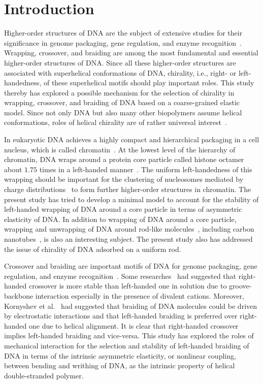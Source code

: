 \documentclass[a4paper,10pt]{article}
\begin{document}
\section{Introduction}
Higher-order structures of DNA are the subject of extensive studies for their significance in genome packaging, gene regulation, and enzyme recognition~\cite{1,2}.
Wrapping, crossover, and braiding are among the most fundamental and essential higher-order structures of DNA.
Since all these higher-order structures are associated with superhelical conformations of DNA, chirality, i.e., right- or left-handedness, of these superhelical motifs should play important roles.
This study thereby has explored a possible mechanism for the selection of chirality in wrapping, crossover, and braiding of DNA based on a coarse-grained elastic model.
Since not only DNA but also many other biopolymers assume helical conformations, roles of helical chirality are of rather universal interest~\cite{3}.

In eukaryotic DNA achieves a highly compact and hierarchical packaging in a cell nucleus, which is called chromatin~\cite{10}.
At the lowest level of the hierarchy of chromatin, DNA wraps around a protein core particle called histone octamer about $1.75$ times in a left-handed manner~\cite{1,2}.
The uniform left-handedness of this wrapping should be important for the clustering of nucleosomes mediated by charge distributions~\cite{16} to form further higher-order structures in chromatin.
The present study has tried to develop a minimal model to account for the stability of left-handed wrapping of DNA around a core particle in terms of asymmetric elasticity of DNA.
In addition to wrapping of DNA around a core particle, wrapping and unwrapping of DNA around rod-like molecules~\cite{27}, including carbon nanotubes~\cite{rod_2}, is also an interesting subject.
The present study also has addressed the issue of chirality of DNA adsorbed on a uniform rod.

Crossover and braiding are important motifs of DNA for genome packaging, gene regulation, and enzyme recognition~\cite{br_1}.
Some researches~\cite{br_1, br_2, br_3} had suggested that right-handed crossover is more stable than left-handed one in solution due to groove-backbone interaction especially in the presence of divalent cations.
Moreover, Kornyshev et al.~\cite{br_4, br_5} had suggested that braiding of DNA molecules could be driven by electrostatic interactions and that left-handed braiding is preferred over right-handed one due to helical alignment.
It is clear that right-handed crossover implies left-handed braiding and vice-versa.
This study has explored the roles of mechanical interaction for the selection and stability of left-handed braiding of DNA in terms of the intrinsic asymmetric elasticity, or nonlinear coupling, between bending and writhing of DNA, as the intrinsic property of helical double-stranded polymer.
\end{document}
